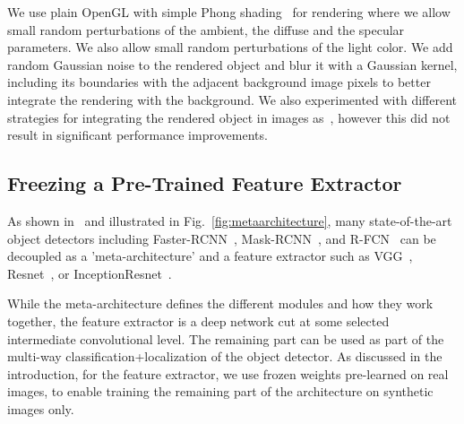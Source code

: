 \documentclass[10pt,twocolumn,letterpaper]{article}
\begin{document}
We  use plain OpenGL with simple Phong  shading~\cite{Phong75}   for  rendering  where  we   allow  small  random
perturbations of the ambient, the diffuse  and the specular parameters.  We also
allow small  random perturbations  of the  light color.   We add  random Gaussian
noise to the rendered  object and blur it with a  Gaussian kernel, including its
boundaries  with  the  adjacent  background  image pixels  to  better
integrate  the  rendering  with  the  background.   We  also  experimented  with
different   strategies   for  integrating   the   rendered   object  in   images
as~\cite{Dwibedi17},  however this  did  not result  in significant  performance
improvements.








\subsection{Freezing a Pre-Trained Feature Extractor}
\label{sec:enabling_synthetic_data}

As shown  in~\cite{Huang17} and illustrated  in Fig.~\ref{fig:metaarchitecture},
many    state-of-the-art    object     detectors    including    
Faster-RCNN~\cite{faster_rcnn},          Mask-RCNN~\cite{mask_rcnn},         and
R-FCN~\cite{rfcn}  can  be decoupled  as  a  'meta-architecture' and  a  feature
extractor     such     as    VGG~\cite{vgg},     Resnet~\cite{resnet101},     or
InceptionResnet~\cite{inception_resnet}.

While  the meta-architecture  defines the  different modules  and how  they work
together,  the  feature  extractor  is  a deep  network  cut  at  some  selected
intermediate convolutional level. The remaining part  can be used as part of the
multi-way classification+localization  of the object detector.   As discussed in
the introduction, for the feature extractor,  we use frozen weights pre-learned on real
images, to  enable training  the remaining part  of the  architecture on  synthetic images
only.
\end{document}
